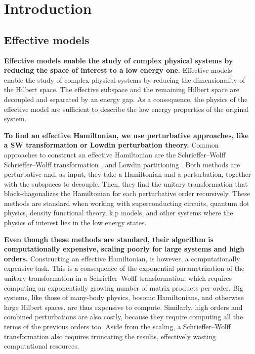 \section{Introduction}

\subsection{Effective models}

\textbf{Effective models enable the study of complex physical systems by reducing the
space of interest to a low energy one.}
Effective models enable the study of complex physical systems by reducing the
dimensionality of the Hilbert space.
The effective subspace and the remaining Hilbert space are decoupled and
separated by an energy gap.
As a consequence, the physics of the effective model are sufficient to describe
the low energy properties of the original system.

\textbf{To find an effective Hamiltonian, we use perturbative approaches, like a SW
transformation or Lowdin perturbation theory.}
Common approaches to construct an effective Hamiltonian are the Schrieffer--Wolff
Schrieffer--Wolff transformation
\cite{Schrieffer_1966}, \cite{Bravyi_2011}
and Lowdin partitioning \cite{White_1950}.
Both methods are perturbative and, as input, they take a Hamiltonian and a
perturbation, together with the subspaces to decouple.
Then, they find the unitary transformation that block-diagonalizes the
Hamiltonian for each perturbative order recursively.
These methods are standard when working with superconducting circuits,
quantum dot physics, density functional theory, k.p models, and other
systems where the physics of interest lies in the low energy states.

\textbf{Even though these methods are standard, their algorithm is computationally
expensive, scaling poorly for large systems and high orders.}
Constructing an effective Hamiltonian, is however, a computationally expensive
task.
This is a consequence of the exponential parametrization of the unitary
transformation in a Schrieffer--Wolff transformation, which requires computing
an exponentially growing number of matrix products per order.
Big systems, like those of many-body physics, bosonic Hamiltonians, and
otherwise large Hilbert spaces, are thus expensive to compute.
Similarly, high orders and combined perturbations are also costly, because they
require computing all the terms of the previous orders too.
Aside from the scaling, a Schrieffer--Wolff transformation also requires
truncating the results, effectively wasting computational resources.

